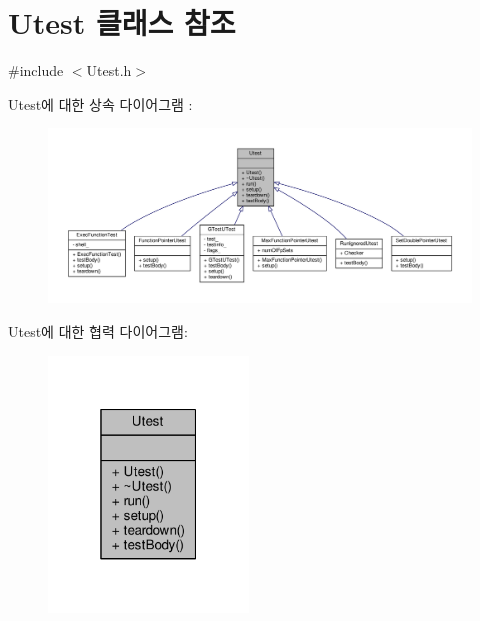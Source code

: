 \hypertarget{class_utest}{}\section{Utest 클래스 참조}
\label{class_utest}


{\ttfamily \#include $<$Utest.\+h$>$}



Utest에 대한 상속 다이어그램 \+: 
\nopagebreak
\begin{figure}[H]
\begin{center}
\leavevmode
\includegraphics[width=350pt]{class_utest__inherit__graph}
\end{center}
\end{figure}


Utest에 대한 협력 다이어그램\+:
\nopagebreak
\begin{figure}[H]
\begin{center}
\leavevmode
\includegraphics[width=151pt]{class_utest__coll__graph}
\end{center}
\end{figure}
